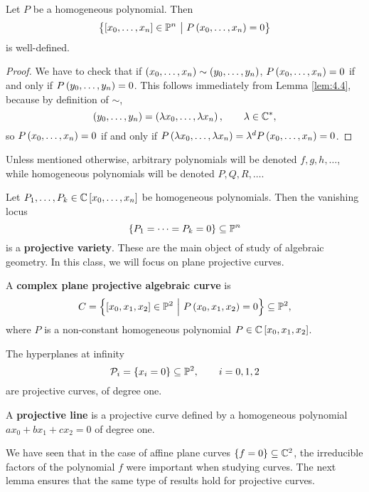 \begin{proposition}
Let $ P $ be a homogeneous polynomial. Then
$$ \cbr{\sbr{x_0, \dots, x_n} \in \PP^n \st P\br{x_0, \dots, x_n} = 0} $$
is well-defined.
\end{proposition}

\begin{proof}
We have to check that if $ \br{x_0, \dots, x_n} \sim \br{y_0, \dots, y_n} $, $ P\br{x_0, \dots, x_n} = 0 $ if and only if $ P\br{y_0, \dots, y_n} = 0 $. This follows immediately from Lemma \ref{lem:4.4}, because by definition of $ \sim $,
$$ \br{y_0, \dots, y_n} = \br{\lambda x_0, \dots, \lambda x_n}, \qquad \lambda \in \CC^*, $$
so $ P\br{x_0, \dots, x_n} = 0 $ if and only if $ P\br{\lambda x_0, \dots, \lambda x_n} = \lambda^dP\br{x_0, \dots, x_n} = 0 $.
\end{proof}

\begin{notation}
Unless mentioned otherwise, arbitrary polynomials will be denoted $ f, g, h, \dots $, while homogeneous polynomials will be denoted $ P, Q, R, \dots $.
\end{notation}

Let $ P_1, \dots, P_k \in \CC\sbr{x_0, \dots, x_n} $ be homogeneous polynomials. Then the vanishing locus
$$ \cbr{P_1 = \dots = P_k = 0} \subseteq \PP^n $$
is a \textbf{projective variety}. These are the main object of study of algebraic geometry. In this class, we will focus on plane projective curves.

\begin{definition}
A \textbf{complex plane projective algebraic curve} is
$$ C = \cbr{\sbr{x_0, x_1, x_2} \in \PP^2 \st P\br{x_0, x_1, x_2} = 0} \subseteq \PP^2, $$
where $ P $ is a non-constant homogeneous polynomial $ P \in \CC\sbr{x_0, x_1, x_2} $.
\end{definition}

\begin{example}
The hyperplanes at infinity
$$ \PPP_i = \cbr{x_i = 0} \subseteq \PP^2, \qquad i = 0, 1, 2 $$
are projective curves, of degree one.
\end{example}

\begin{definition}
A \textbf{projective line} is a projective curve defined by a homogeneous polynomial $ ax_0 + bx_1 + cx_2 = 0 $ of degree one.
\end{definition}

\pagebreak

We have seen that in the case of affine plane curves $ \cbr{f = 0} \subseteq \CC^2 $, the irreducible factors of the polynomial $ f $ were important when studying curves. The next lemma ensures that the same type of results hold for projective curves.

